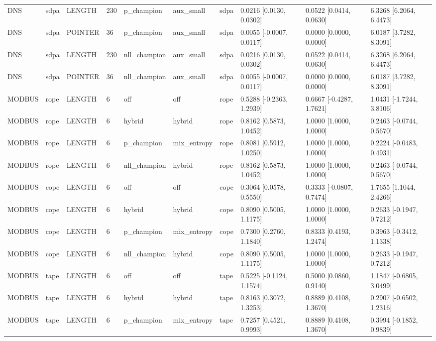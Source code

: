 \begin{tabular}{llllllllll}
DNS & sdpa & LENGTH & 230 & p\_champion & aux\_small & sdpa & 0.0216 [0.0130, 0.0302] & 0.0522 [0.0414, 0.0630] & 6.3268 [6.2064, 6.4473] \\
DNS & sdpa & POINTER & 36 & p\_champion & aux\_small & sdpa & 0.0055 [-0.0007, 0.0117] & 0.0000 [0.0000, 0.0000] & 6.0187 [3.7282, 8.3091] \\
DNS & sdpa & LENGTH & 230 & nll\_champion & aux\_small & sdpa & 0.0216 [0.0130, 0.0302] & 0.0522 [0.0414, 0.0630] & 6.3268 [6.2064, 6.4473] \\
DNS & sdpa & POINTER & 36 & nll\_champion & aux\_small & sdpa & 0.0055 [-0.0007, 0.0117] & 0.0000 [0.0000, 0.0000] & 6.0187 [3.7282, 8.3091] \\
MODBUS & rope & LENGTH & 6 & off & off & rope & 0.5288 [-0.2363, 1.2939] & 0.6667 [-0.4287, 1.7621] & 1.0431 [-1.7244, 3.8106] \\
MODBUS & rope & LENGTH & 6 & hybrid & hybrid & rope & 0.8162 [0.5873, 1.0452] & 1.0000 [1.0000, 1.0000] & 0.2463 [-0.0744, 0.5670] \\
MODBUS & rope & LENGTH & 6 & p\_champion & mix\_entropy & rope & 0.8081 [0.5912, 1.0250] & 1.0000 [1.0000, 1.0000] & 0.2224 [-0.0483, 0.4931] \\
MODBUS & rope & LENGTH & 6 & nll\_champion & hybrid & rope & 0.8162 [0.5873, 1.0452] & 1.0000 [1.0000, 1.0000] & 0.2463 [-0.0744, 0.5670] \\
MODBUS & cope & LENGTH & 6 & off & off & cope & 0.3064 [0.0578, 0.5550] & 0.3333 [-0.0807, 0.7474] & 1.7655 [1.1044, 2.4266] \\
MODBUS & cope & LENGTH & 6 & hybrid & hybrid & cope & 0.8090 [0.5005, 1.1175] & 1.0000 [1.0000, 1.0000] & 0.2633 [-0.1947, 0.7212] \\
MODBUS & cope & LENGTH & 6 & p\_champion & mix\_entropy & cope & 0.7300 [0.2760, 1.1840] & 0.8333 [0.4193, 1.2474] & 0.3963 [-0.3412, 1.1338] \\
MODBUS & cope & LENGTH & 6 & nll\_champion & hybrid & cope & 0.8090 [0.5005, 1.1175] & 1.0000 [1.0000, 1.0000] & 0.2633 [-0.1947, 0.7212] \\
MODBUS & tape & LENGTH & 6 & off & off & tape & 0.5225 [-0.1124, 1.1574] & 0.5000 [0.0860, 0.9140] & 1.1847 [-0.6805, 3.0499] \\
MODBUS & tape & LENGTH & 6 & hybrid & hybrid & tape & 0.8163 [0.3072, 1.3253] & 0.8889 [0.4108, 1.3670] & 0.2907 [-0.6502, 1.2316] \\
MODBUS & tape & LENGTH & 6 & p\_champion & mix\_entropy & tape & 0.7257 [0.4521, 0.9993] & 0.8889 [0.4108, 1.3670] & 0.3994 [-0.1852, 0.9839] \\

\end{tabular}
